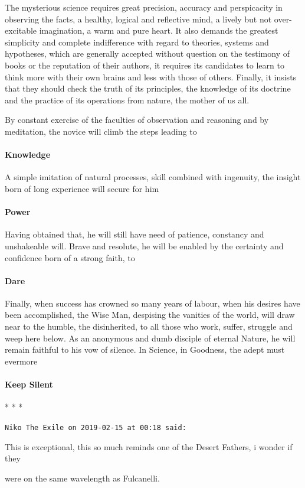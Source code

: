The mysterious science requires great precision, accuracy and perspicacity in observing the facts, a healthy, logical and reflective mind, a lively but not over-excitable imagination, a warm and pure heart. It also demands the greatest simplicity and complete indifference with regard to theories, systems and hypotheses, which are generally accepted without question on the testimony of books or the reputation of their authors, it requires its candidates to learn to think more with their own brains and less with those of others. Finally, it insists that they should check the truth of its principles, the knowledge of its doctrine and the practice of its operations from nature, the mother of us all.

By constant exercise of the faculties of observation and reasoning and by meditation, the novice will climb the steps leading to 

\paragraph{Knowledge}
A simple imitation of natural processes, skill combined with ingenuity, the insight born of long experience will secure for him

\paragraph{Power}
Having obtained that, he will still have need of patience, constancy and unshakeable will. Brave and resolute, he will be enabled by the certainty and confidence born of a strong faith, to

\paragraph{Dare}
Finally, when success has crowned so many years of labour, when his desires have been accomplished, the Wise Man, despising the vanities of the world, will draw near to the humble, the disinherited, to all those who work, suffer, struggle and weep here below. As an anonymous and dumb disciple of eternal Nature, he will remain faithful to his vow of silence. In Science, in Goodness, the adept must evermore

\paragraph{Keep Silent}


\begin{center}* * *\end{center}

\begin{footnotesize}\begin{sffamily}



\texttt{Niko The Exile on 2019-02-15 at 00:18 said: }

This is exceptional, this so much reminds one of the Desert Fathers, i wonder if they

were on the same wavelength as Fulcanelli.


\end{sffamily}\end{footnotesize}
